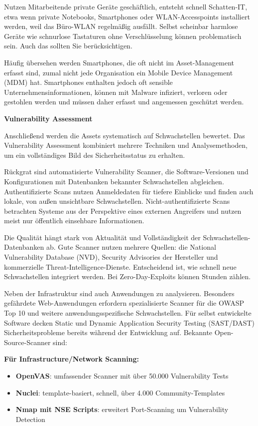 Nutzen Mitarbeitende private Geräte geschäftlich, entsteht schnell Schatten-IT, etwa wenn private Notebooks, Smartphones oder WLAN-Accesspoints installiert werden, weil das Büro-WLAN regelmäßig ausfällt. Selbst scheinbar harmlose Geräte wie schnurlose Tastaturen ohne Verschlüsselung können problematisch sein. Auch das sollten Sie berücksichtigen.

Häufig übersehen werden Smartphones, die oft nicht im Asset-Management erfasst sind, zumal nicht jede Organisation ein Mobile Device Management (MDM) hat. Smartphones enthalten jedoch oft sensible Unternehmensinformationen, können mit Malware infiziert, verloren oder gestohlen werden und müssen daher erfasst und angemessen geschützt werden.

\textbf{Vulnerability Assessment}

Anschließend werden die Assets systematisch auf Schwachstellen bewertet. Das Vulnerability Assessment kombiniert mehrere Techniken und Analysemethoden, um ein vollständiges Bild des Sicherheitsstatus zu erhalten.

Rückgrat sind automatisierte Vulnerability Scanner, die Software-Versionen und Konfigurationen mit Datenbanken bekannter Schwachstellen abgleichen. Authentifizierte Scans nutzen Anmeldedaten für tiefere Einblicke und finden auch lokale, von außen unsichtbare Schwachstellen. Nicht-authentifizierte Scans betrachten Systeme aus der Perspektive eines externen Angreifers und nutzen meist nur öffentlich einsehbare Informationen.

Die Qualität hängt stark von Aktualität und Vollständigkeit der Schwachstellen-Datenbanken ab. Gute Scanner nutzen mehrere Quellen: die National Vulnerability Database (NVD), Security Advisories der Hersteller und kommerzielle Threat-Intelligence-Dienste. Entscheidend ist, wie schnell neue Schwachstellen integriert werden. Bei Zero-Day-Exploits können Stunden zählen.

Neben der Infrastruktur sind auch Anwendungen zu analysieren. Besonders gefährdete Web-Anwendungen erfordern spezialisierte Scanner für die OWASP Top 10 und weitere anwendungsspezifische Schwachstellen. Für selbst entwickelte Software decken Static und Dynamic Application Security Testing (SAST/DAST) Sicherheitsprobleme bereits während der Entwicklung auf.
\newpage
Bekannte Open-Source-Scanner sind:

\textbf{Für Infrastructure/Network Scanning:}
\begin{itemize}
    \item \textbf{OpenVAS}: umfassender Scanner mit über 50.000 Vulnerability Tests
    \item \textbf{Nuclei}: template-basiert, schnell, über 4.000 Community-Templates
    \item \textbf{Nmap mit NSE Scripts}: erweitert Port-Scanning um Vulnerability Detection
\end{itemize}

